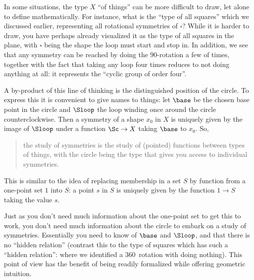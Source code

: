 
In some situations, the type $X$ ``of things'' can be more difficult to draw,
let alone to define mathematically.  For instance, what is the ``type of all squares'' which we discussed earlier, representing all rotational symmetries of $\square$?  While it is harder to draw, you have perhaps already visualized it as the type of all squares in the plane, with $\square$ being the shape the loop must start and stop in.  In addition, we see that any symmetry can be reached by doing the $90$\textdegree-rotation a few of times, together with the fact that taking any loop four times reduces to not doing anything at all: it represents the ``cyclic group of order four''.


A by-product of this line of thinking is the distinguished position of the circle. To express this it is convenient to give names to things: let $\base$ be the chosen base point in the circle and $\Sloop$ the loop winding once around the circle counterclockwise. Then a symmetry of a shape $x_0$ in $X$ is uniquely given by the image of $\Sloop $ under a function $\Sc\to X$ taking $\base$ to $x_0$. So,
\begin{quote}
  the study of symmetries is the study of (pointed) functions between types of things, with the circle being the type that gives you access to individual symmetries.
\end{quote}

This is similar to the idea of replacing membership in a set $S$ by function from a one-point set $1$ into $S$: a point $s$ in $S$ is uniquely given by the function $1\to S$ taking the value $s$.


Just as you don't need much information about the one-point set to get this to work, you don't need much information about the circle to embark on a study of symmetries.
Essentially you need to know of $\base $ and $\Sloop $, and that there is no ``hidden relation'' (contrast this to the type of squares which has such a ``hidden relation'': where we identified a $360$\textdegree\ rotation with doing nothing).  This point of view has the benefit of being readily formalized while offering geometric intuition.


